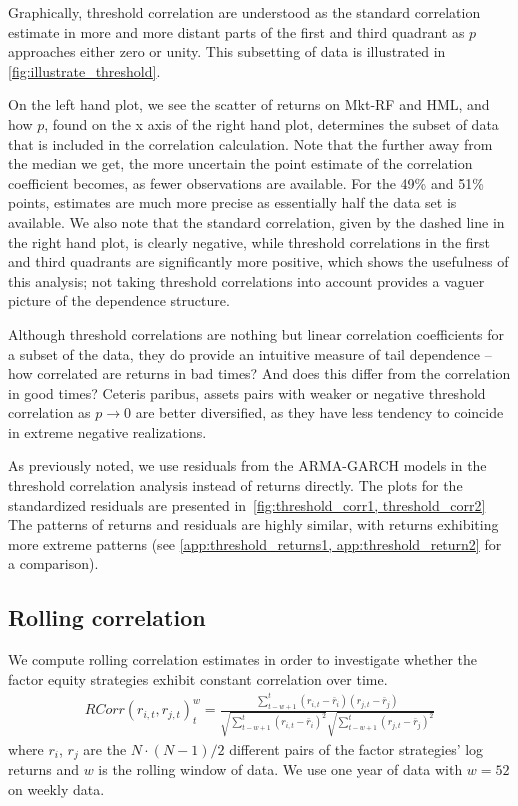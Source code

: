 Graphically, threshold correlation are understood as the standard correlation estimate in more and more distant parts of the first and third quadrant as $p$ approaches either zero or unity. This subsetting of data is illustrated in \autoref{fig:illustrate_threshold}. 

On the left hand plot, we see the scatter of returns on Mkt-RF and HML, and how $p$, found on the x axis of the right hand plot, determines the subset of data that is included in the correlation calculation. Note that the further away from the median we get, the more uncertain the point estimate of the correlation coefficient becomes, as fewer observations are available. For the 49\% and 51\% points, estimates are much more precise as essentially half the data set is available. We also note that the standard correlation, given by the dashed line in the right hand plot, is clearly negative, while threshold correlations in the first and third quadrants are significantly more positive, which shows the usefulness of this analysis; not taking threshold correlations into account provides a vaguer picture of the dependence structure.

Although threshold correlations are nothing but linear correlation coefficients for a subset of the data, they do provide an intuitive measure of tail dependence -- how correlated are returns in bad times? And does this differ from the correlation in good times? Ceteris paribus, assets pairs with weaker or negative threshold correlation as $p \rightarrow 0$ are better diversified, as they have less tendency to coincide in extreme negative realizations.

As previously noted, we use residuals from the ARMA-GARCH models in the threshold correlation analysis instead of returns directly. The plots for the standardized residuals are presented in~\autoref{fig:threshold_corr1, threshold_corr2} The patterns of returns and residuals are highly similar, with returns exhibiting more extreme patterns (see \autoref{app:threshold_returns1, app:threshold_return2} for a comparison).



\subsection{Rolling correlation}
We compute rolling correlation estimates in order to investigate whether the factor equity strategies exhibit constant correlation over time. 
\begin{align}
    RCorr(r_{i, t}, r_{j, t})_t^{w} = \frac{\sum^{t}_{t-w+1}(r_{i, t} - \bar{r}_i)(r_{j,t} - \bar{r}_j)}{\sqrt{\sum^{t}_{t-w+1} (r_{i,t} - \bar{r}_i)^2} \sqrt{\sum^{t}_{t-w+1} (r_{j,t} - \bar{r}_j)^2}}
\end{align}
where $r_i$, $r_j$ are the $N \cdot (N-1) / 2$ different pairs of the factor strategies' log returns and $w$ is the rolling window of data. We use one year of data with $w = 52$ on weekly data.


